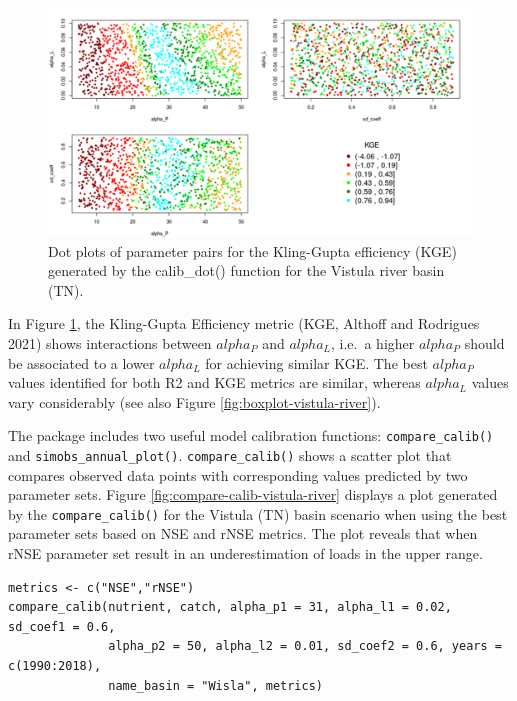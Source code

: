 \begin{figure}[H]
\includegraphics[width=1\linewidth,height=0.35\textheight]{figures/fig5} \caption{Dot plots of parameter pairs for the Kling-Gupta efficiency (KGE) generated by the calib\_dot() function for the Vistula river basin (TN).}\label{fig:dot-plot-vistula-river}
\end{figure}

\noindent In Figure \ref{fig:dot-plot-vistula-river}, the Kling-Gupta Efficiency metric (KGE, Althoff and Rodrigues 2021) shows interactions between \(alpha_P\) and \(alpha_L\), i.e.~a higher \(alpha_P\) should be associated to a lower \(alpha_L\) for achieving similar KGE. The best \(alpha_P\) values identified for both R2 and KGE metrics are similar, whereas \(alpha_L\) values vary considerably (see also Figure \ref{fig:boxplot-vistula-river}).

The  package includes two useful model calibration functions: \texttt{compare\_calib()} and \texttt{simobs\_annual\_plot()}. \texttt{compare\_calib()} shows a scatter plot that compares observed data points with corresponding values predicted by two parameter sets. Figure \ref{fig:compare-calib-vistula-river} displays a plot generated by the \texttt{compare\_calib()} for the Vistula (TN) basin scenario when using the best parameter sets based on NSE and rNSE metrics. The plot reveals that when rNSE parameter set result in an underestimation of loads in the upper range.

\begin{verbatim}
metrics <- c("NSE","rNSE")
compare_calib(nutrient, catch, alpha_p1 = 31, alpha_l1 = 0.02, sd_coef1 = 0.6,
              alpha_p2 = 50, alpha_l2 = 0.01, sd_coef2 = 0.6, years = c(1990:2018), 
              name_basin = "Wisla", metrics)
\end{verbatim}

